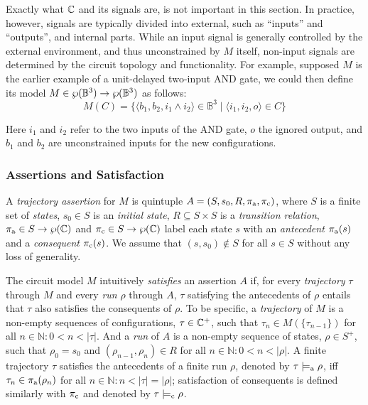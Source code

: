 
Exactly what $\mathbb{C}$ and its signals are, is not important in this section. In practice, however, signals are typically divided into external, such as ``inputs'' and ``outputs'', and internal parts. While an input signal is generally controlled by the external environment, and thus unconstrained by $M$ itself, non-input signals are determined by the circuit topology and functionality. For example, supposed $M$ is the earlier example of a unit-delayed two-input AND gate, we could then define its model $M \in \wp(\mathbb{B}^{3}) \rightarrow \wp(\mathbb{B}^{3})$ as follows:
%
\begin{equation*}
M(C) = \{ \langle b_{1}, b_{2}, i_{1} \wedge i_{2} \rangle \in \mathbb{B}^{3} \mid \langle i_{1}, i_{2}, o \rangle \in C \}
\end{equation*}

\noindent Here $i_{1}$ and $i_{2}$ refer to the two inputs of the AND gate, $o$ the ignored output, and $b_{1}$ and $b_{2}$ are unconstrained inputs for the new configurations.

\subsubsection{Assertions and Satisfaction} \label{sec:set-ste-sat}

A \textit{trajectory assertion} for $M$ is quintuple $A = (S, s_{0}, R, \operatorname{\pi_{\textrm{a}}}, \operatorname{\pi_{\textrm{c}}})$, where $S$ is a finite set of \textit{states}, $s_{0} \in S$ is an \textit{initial state}, $R \subseteq S \times S$ is a \textit{transition relation}, $\operatorname{\pi_{\textrm{a}}} \in S \rightarrow \wp(\mathbb{C})$ and $\operatorname{\pi_{\textrm{c}}} \in S \rightarrow \wp(\mathbb{C})$ label each state $s$ with an \textit{antecedent} $\operatorname{\pi_{\textrm{a}}}(s)$ and a \textit{consequent} $\operatorname{\pi_{\textrm{c}}}(s)$. We assume that $(s,s_{0}) \notin S$ for all $s \in S$ without any loss of generality.

The circuit model $M$ intuitively \textit{satisfies} an assertion $A$ if, for every \textit{trajectory} $\tau$ through $M$ and every \textit{run} $\rho$ through $A$, $\tau$ satisfying the antecedents of $\rho$ entails that $\tau$ also satisfies the consequents of $\rho$. To be specific, a \textit{trajectory} of $M$ is a non-empty sequences of configurations, $\tau \in \mathbb{C}^{+}$, such that $\tau_{n} \in M(\{ \tau_{n-1} \})$ for all $n \in \mathbb{N} : 0 < n < | \tau |$. And a \textit{run} of $A$ is a non-empty sequence of states, $\rho \in S^{+}$, such that $\rho_{0} = s_{0}$ and $(\rho_{n-1}, \rho_{n}) \in R$ for all $n \in \mathbb{N} : 0 < n < | \rho |$. A finite trajectory $\tau$ satisfies the antecedents of a finite run $\rho$, denoted by $\tau \models_{\textrm{a}} \rho$, iff $\tau_{n} \in \operatorname{\pi_{\textrm{a}}}(\rho_{n})$ for all $n \in \mathbb{N} : n < | \tau | = | \rho |$; satisfaction of consequents is defined similarly with $\operatorname{\pi_{\textrm{c}}}$ and denoted by $\tau \models_{\textrm{c}} \rho$.

